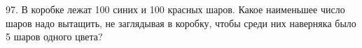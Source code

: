 97. В коробке лежат 100 синих и 100 красных шаров. Какое наименьшее число шаров надо вытащить, не заглядывая в коробку, чтобы среди них наверняка было 5 шаров одного цвета?\\
